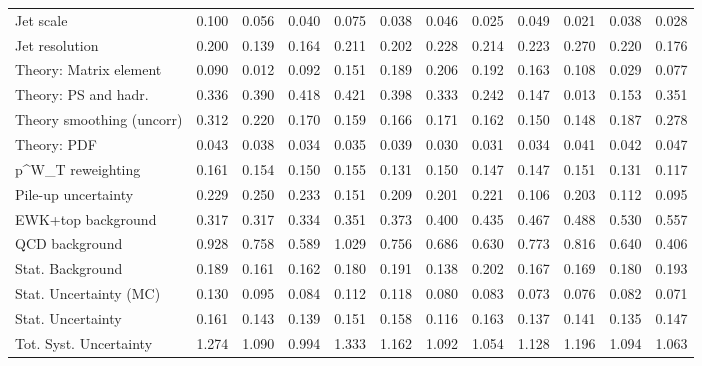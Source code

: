 \begin{tabular}{l|p{0.6cm}p{0.6cm}p{0.6cm}p{0.6cm}p{0.6cm}p{0.6cm}p{0.6cm}p{0.6cm}p{0.6cm}p{0.6cm}p{0.6cm}}
Jet scale                                & 0.100 & 0.056 & 0.040 & 0.075 & 0.038 & 0.046 & 0.025 & 0.049 & 0.021 & 0.038 & 0.028 \\
Jet resolution                           & 0.200 & 0.139 & 0.164 & 0.211 & 0.202 & 0.228 & 0.214 & 0.223 & 0.270 & 0.220 & 0.176 \\
Theory: Matrix element                   & 0.090 & 0.012 & 0.092 & 0.151 & 0.189 & 0.206 & 0.192 & 0.163 & 0.108 & 0.029 & 0.077 \\
Theory: PS and hadr.                     & 0.336 & 0.390 & 0.418 & 0.421 & 0.398 & 0.333 & 0.242 & 0.147 & 0.013 & 0.153 & 0.351 \\
Theory smoothing (uncorr)                & 0.312 & 0.220 & 0.170 & 0.159 & 0.166 & 0.171 & 0.162 & 0.150 & 0.148 & 0.187 & 0.278 \\
Theory: PDF                              & 0.043 & 0.038 & 0.034 & 0.035 & 0.039 & 0.030 & 0.031 & 0.034 & 0.041 & 0.042 & 0.047 \\
p^{W}_{T} reweighting                    & 0.161 & 0.154 & 0.150 & 0.155 & 0.131 & 0.150 & 0.147 & 0.147 & 0.151 & 0.131 & 0.117 \\
Pile-up uncertainty                      & 0.229 & 0.250 & 0.233 & 0.151 & 0.209 & 0.201 & 0.221 & 0.106 & 0.203 & 0.112 & 0.095 \\
EWK+top background                       & 0.317 & 0.317 & 0.334 & 0.351 & 0.373 & 0.400 & 0.435 & 0.467 & 0.488 & 0.530 & 0.557 \\
QCD background                           & 0.928 & 0.758 & 0.589 & 1.029 & 0.756 & 0.686 & 0.630 & 0.773 & 0.816 & 0.640 & 0.406 \\
Stat. Background                         & 0.189 & 0.161 & 0.162 & 0.180 & 0.191 & 0.138 & 0.202 & 0.167 & 0.169 & 0.180 & 0.193 \\
Stat. Uncertainty (MC)                   & 0.130 & 0.095 & 0.084 & 0.112 & 0.118 & 0.080 & 0.083 & 0.073 & 0.076 & 0.082 & 0.071 \\
\hline
Stat. Uncertainty                        & 0.161 & 0.143 & 0.139 & 0.151 & 0.158 & 0.116 & 0.163 & 0.137 & 0.141 & 0.135 & 0.147 \\
\hline
Tot. Syst. Uncertainty                   & 1.274 & 1.090 & 0.994 & 1.333 & 1.162 & 1.092 & 1.054 & 1.128 & 1.196 & 1.094 & 1.063 \\
\hline
\end{tabular}
